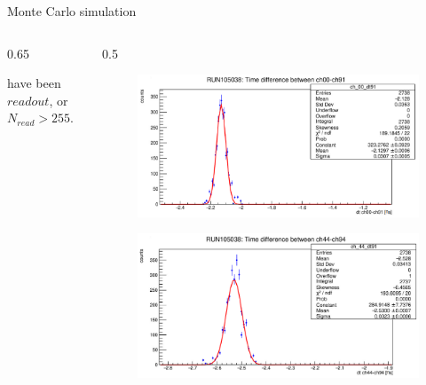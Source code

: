\documentclass{beamer}
\begin{document}
\begin{frame}{Monte Carlo simulation}
\begin{columns}
\begin{column}{0.65\framewidth}
\begin{itemize}
{ have been $readout$, or $N_{read}>255$. }
\end{itemize}
   \end{column}
   \begin{column}{0.5\framewidth}
    \begin{figure}[h!]
        \centering
    \includegraphics[width=\columnwidth]{figures/png/Screenshot from 2023-12-03 11-50-50.png}
    \label{fig:delay1}
  \end{figure}
  \begin{figure}[h!]
        \centering
    \includegraphics[width=\columnwidth]{figures/png/Screenshot from 2023-12-03 11-50-33.png}

    \label{fig:delay2}
  \end{figure}
   \end{column}
  \end{columns}



    \end{frame}

    
\end{document}
